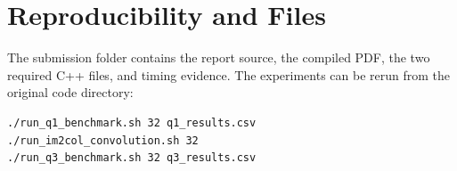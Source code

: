 \documentclass[11pt]{article}
\begin{document}
\section{Reproducibility and Files}

The submission folder contains the report source, the compiled PDF, the two required C++ files, and timing evidence. The experiments can be rerun from the original code directory:

\begin{verbatim}
./run_q1_benchmark.sh 32 q1_results.csv
./run_im2col_convolution.sh 32
./run_q3_benchmark.sh 32 q3_results.csv
\end{verbatim}
\end{document}
